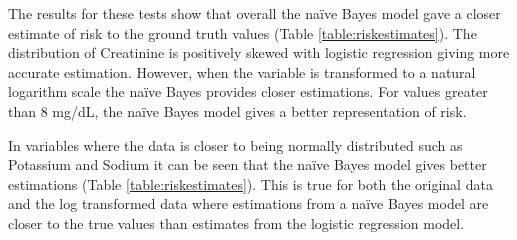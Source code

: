 \documentclass[a4paper,UKenglish]{oasics-v2016}
\begin{document}
The results for these tests show that overall the naïve Bayes model gave a closer estimate of risk to the ground truth values (Table \ref{table:riskestimates}). The distribution of Creatinine is positively skewed with logistic regression giving more accurate estimation. However, when the variable is transformed to a natural logarithm scale the naïve Bayes provides closer estimations. For values greater than 8 mg/dL, the naïve Bayes model gives a better representation of risk.

In variables where the data is closer to being normally distributed such as Potassium and Sodium it can be seen that the naïve Bayes model gives better estimations (Table \ref{table:riskestimates}). This is true for both the original data and the log transformed data where estimations from a naïve Bayes model are closer to the true values than estimates from the logistic regression model.
\end{document}
